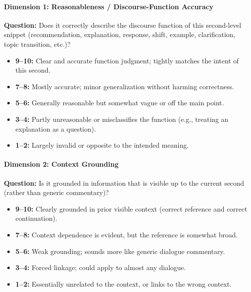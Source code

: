 \paragraph{Dimension 1: Reasonableness / Discourse-Function Accuracy}
\textbf{Question:} Does it correctly describe the discourse function of this second-level snippet (recommendation, explanation, response, shift, example, clarification, topic transition, etc.)?
\begin{itemize}
  \item \textbf{9--10:} Clear and accurate function judgment; tightly matches the intent of this second.
  \item \textbf{7--8:} Mostly accurate; minor generalization without harming correctness.
  \item \textbf{5--6:} Generally reasonable but somewhat vague or off the main point.
  \item \textbf{3--4:} Partly unreasonable or misclassifies the function (e.g., treating an explanation as a question).
  \item \textbf{1--2:} Largely invalid or opposite to the intended meaning.
\end{itemize}

\paragraph{Dimension 2: Context Grounding}
\textbf{Question:} Is it grounded in information that is visible up to the current second (rather than generic commentary)?
\begin{itemize}
  \item \textbf{9--10:} Clearly grounded in prior visible context (correct reference and correct continuation).
  \item \textbf{7--8:} Context dependence is evident, but the reference is somewhat broad.
  \item \textbf{5--6:} Weak grounding; sounds more like generic dialogue commentary.
  \item \textbf{3--4:} Forced linkage; could apply to almost any dialogue.
  \item \textbf{1--2:} Essentially unrelated to the context, or links to the wrong context.
\end{itemize}

